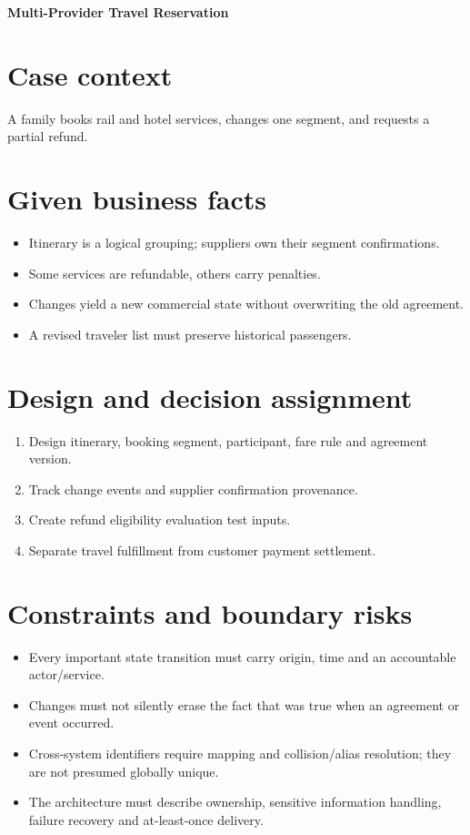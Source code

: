 \documentclass[11pt,letterpaper]{article}
\begin{document}
\begin{center}
{\LARGE\bfseries\color{navy} Multi-Provider Travel Reservation}\par
\vspace{0.25em}{\large Scenario-based enterprise case study}\par
{}
\end{center}
\vspace{0.8em}
\section{Case context}
A family books rail and hotel services, changes one segment, and requests a partial refund.


\section{Given business facts}
\begin{itemize}
\item Itinerary is a logical grouping; suppliers own their segment confirmations.
\item Some services are refundable, others carry penalties.
\item Changes yield a new commercial state without overwriting the old agreement.
\item A revised traveler list must preserve historical passengers.
\end{itemize}

\section{Design and decision assignment}
\begin{enumerate}
\item Design itinerary, booking segment, participant, fare rule and agreement version.
\item Track change events and supplier confirmation provenance.
\item Create refund eligibility evaluation test inputs.
\item Separate travel fulfillment from customer payment settlement.
\end{enumerate}

\section{Constraints and boundary risks}
\begin{itemize}
\item Every important state transition must carry origin, time and an accountable actor/service.
\item Changes must not silently erase the fact that was true when an agreement or event occurred.
\item Cross-system identifiers require mapping and collision/alias resolution; they are not presumed globally unique.
\item The architecture must describe ownership, sensitive information handling, failure recovery and at-least-once delivery.
\end{itemize}
\end{document}
